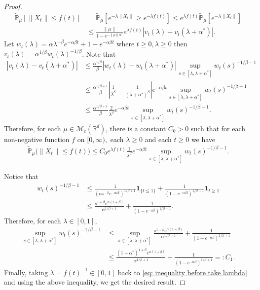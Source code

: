 \documentclass[12pt,oneside,english]{amsart}
\theoremstyle{plain}
\theoremstyle{definition}
\numberwithin{equation}{section}
\begin{document}
\begin{proof}
\begin{align*}
    \mathbb{\tilde{P}}_{\mu}[\|X_t\|\leq f(t)]&=\mathbb{\tilde{P}}_{\mu}[e^{-\lambda\|X_t\|}\geq e^{-\lambda f(t)}]\leq e^{\lambda f(t)}\mathbb{\tilde{P}}_{\mu}[e^{-\lambda \|X_t\|}]\\
    &\leq \frac{\|\mu\|}{1-e^{-\|\mu\|\alpha^*}}e^{\lambda f(t)}\left|v_t(\lambda)-v_t(\lambda+\alpha^*)\right|.
\end{align*}
	Let $w_t(\lambda)=\alpha \lambda^{-\beta}e^{-\alpha \beta t}+1-e^{-\alpha\beta t}$ where $t\geq 0,\lambda\geq0$ then $v_t(\lambda)=\alpha^{1/\beta}w_t(\lambda)^{-1/\beta}$.
Note that
\begin{align*}
    \left|v_t(\lambda)-v_t(\lambda+\alpha^*)\right|&\leq\frac {\alpha^{1/\beta}}{\beta} \left|w_t(\lambda)-w_t(\lambda+\alpha^*)\right| \sup_{s\in [\lambda,\lambda+\alpha^*]}w_t(s)^{-1/\beta-1}\\
    &\leq  \frac{\alpha^{1/\beta+1}}{\beta}\left|\frac{1}{\lambda^{\beta}}-\frac{1}{(\lambda+\alpha^*)^{\beta}}\right|e^{-\alpha\beta t} \sup_{s\in [\lambda,\lambda+\alpha^*]}w_t(s)^{-1/\beta-1}\\
    &\leq  \frac{\alpha^{1/\beta+1}}{\beta}\frac{2}{\lambda^{\beta}}e^{-\alpha\beta t} \sup_{s\in [\lambda,\lambda+\alpha^*]}w_t(s)^{-1/\beta-1}.
\end{align*}
Therefore, for each $\mu\in \mathcal M_c(\mathbb R^d)$, there is a constant $C_0>0$ such that for each non-negative function $f$ on $[0,\infty),$ each $\lambda \geq 0$ and each $t\geq 0$ we have
\begin{align}
\label{eq: inequality before take lambda}
    \mathbb{\tilde{P}}_{\mu}\big(\|X_t\|\leq f(t)\big)
    \leq C_0e^{\lambda f(t)}\frac{1}{\lambda^{\beta}}e^{-\alpha\beta t} \sup_{s\in [\lambda,\lambda+\alpha^*]}w_t(s)^{-1/\beta-1}.
\end{align}

Notice that
\begin{align*}
    w_t(s)^{-1/\beta-1}&\leq \frac{1}{(\alpha s^{-\beta}e^{-\alpha \beta t})^{1/
    \beta+1}}\mathbf{1}_{\{t\leq 1\}}+\frac{1}{(1-e^{-\alpha\beta t})^{1/\beta+1}}\mathbf{1}_{t\geq 1}\\
    &\leq \frac{s^{1+\beta}e^{\alpha(1+\beta)}}{\alpha^{1/\beta +1}}+\frac{1}{(1-e^{-\alpha\beta })^{1/\beta+1}}.
\end{align*}
Therefore, for each $\lambda \in [0,1]$,
\begin{align*}
    \sup_{s\in [\lambda,\lambda+\alpha^*]}w_t(s)^{-1/\beta-1}
    &\leq\sup_{s\in [\lambda,\lambda+\alpha^*]}\frac{s^{1+\beta}e^{\alpha(1+\beta)}}{\alpha^{1/\beta +1}}+\frac{1}{(1-e^{-\alpha\beta })^{1/\beta+1}}\\
    &\leq \frac{(1+\alpha^*)^{1+\beta}e^{\alpha(1+\beta)}}{\alpha^{1/\beta+1}}+\frac{1}{(1-e^{-\alpha\beta })^{1/\beta+1}} =: C_1.
\end{align*}
Finally, taking $\lambda = f(t)^{-1} \in [0,1]$ back to \eqref{eq: inequality before take lambda} and using the above inequality, we get the desired result.
\end{proof}
\end{document}
